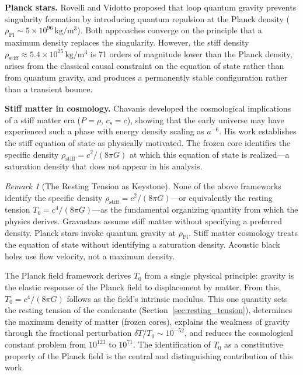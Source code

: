 \documentclass[11pt,a4paper]{article}
\newcommand{\rhostiff}{\ensuremath{\rho_{\mathrm{stiff}}}}
\newcommand{\Tzero}{\ensuremath{T_0}}
\theoremstyle{definition}
\theoremstyle{remark}
\newtheorem{remark}[theorem]{Remark}
\begin{document}
\textbf{Planck stars.} Rovelli and Vidotto \cite{RovelliVidotto2014} proposed that loop quantum gravity prevents singularity formation by introducing quantum repulsion at the Planck density ($\rho_{\mathrm{Pl}} \sim 5 \times 10^{96}\,\mathrm{kg/m^3}$). Both approaches converge on the principle that a maximum density replaces the singularity. However, the stiff density $\rhostiff \approx 5.4 \times 10^{25}\,\mathrm{kg/m^3}$ is 71 orders of magnitude lower than the Planck density, arises from the classical causal constraint on the equation of state rather than from quantum gravity, and produces a permanently stable configuration rather than a transient bounce.

\textbf{Stiff matter in cosmology.} Chavanis \cite{Chavanis2015} developed the cosmological implications of a stiff matter era ($P = \rho$, $c_s = c$), showing that the early universe may have experienced such a phase with energy density scaling as $a^{-6}$. His work establishes the stiff equation of state as physically motivated. The frozen core identifies the specific density $\rhostiff = c^2/(8\pi G)$ at which this equation of state is realized---a saturation density that does not appear in his analysis.

\begin{remark}[The Resting Tension as Keystone]
\label{rem:keystone}
None of the above frameworks identify the specific density $\rhostiff = c^2/(8\pi G)$---or equivalently the resting tension $\Tzero = c^4/(8\pi G)$---as the fundamental organizing quantity from which the physics derives. Gravastars assume stiff matter without specifying a preferred density. Planck stars invoke quantum gravity at $\rho_{\mathrm{Pl}}$. Stiff matter cosmology treats the equation of state without identifying a saturation density. Acoustic black holes use flow velocity, not a maximum density.

The Planck field framework derives $\Tzero$ from a single physical principle: gravity is the elastic response of the Planck field to displacement by matter. From this, $\Tzero = c^4/(8\pi G)$ follows as the field's intrinsic modulus. This one quantity sets the resting tension of the condensate (Section~\ref{sec:resting_tension}), determines the maximum density of matter (frozen cores), explains the weakness of gravity through the fractional perturbation $\delta T/\Tzero \sim 10^{-52}$, and reduces the cosmological constant problem from $10^{123}$ to $10^{71}$. The identification of $\Tzero$ as a constitutive property of the Planck field is the central and distinguishing contribution of this work.
\end{remark}
\end{document}
